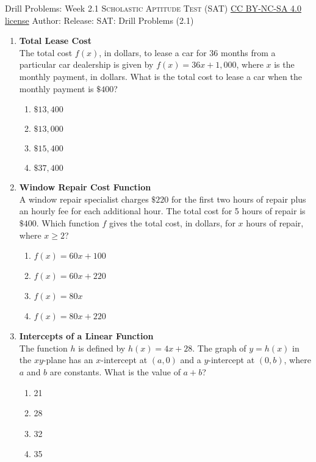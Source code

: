 \newpage\handout
{Drill Problems: Week 2.1}
{\textsc{Scholastic Aptitude Test (SAT)}}
{\href{https://creativecommons.org/licenses/by-nc-sa/4.0/}{CC BY-NC-SA 4.0 license}}
{Author: \BookAuthor}{Release: \generatedOn}
{SAT: Drill Problems (2.1)}






\begin{enumerate}

\item \textbf{Total Lease Cost}\\
The total cost $f(x)$, in dollars, to lease a car for 36 months from a particular car dealership is given by $f(x) = 36x + 1,000$, where $x$ is the monthly payment, in dollars. What is the total cost to lease a car when the monthly payment is $\$400$?
\begin{enumerate}[label=(\Alph*)]
  \item $\$13,400$
  \item $\$13,000$
  \item $\$15,400$
  \item $\$37,400$
\end{enumerate}
\begin{subanswer}
\end{subanswer}


\item \textbf{Window Repair Cost Function}\\
A window repair specialist charges $\$220$ for the first two hours of repair plus an hourly fee for each additional hour. The total cost for 5 hours of repair is $\$400$. Which function $f$ gives the total cost, in dollars, for $x$ hours of repair, where $x \geq 2$?
\begin{enumerate}[label=(\Alph*)]
  \item $f(x) = 60x + 100$
  \item $f(x) = 60x + 220$
  \item $f(x) = 80x$
  \item $f(x) = 80x + 220$
\end{enumerate}
\begin{subanswer}
\end{subanswer}

\newpage

\item \textbf{Intercepts of a Linear Function}\\
The function $h$ is defined by $h(x) = 4x + 28$. The graph of $y = h(x)$ in the $xy$-plane has an $x$-intercept at $(a, 0)$ and a $y$-intercept at $(0, b)$, where $a$ and $b$ are constants. What is the value of $a + b$?
\begin{enumerate}[label=(\Alph*)]
  \item 21
  \item 28
  \item 32
  \item 35
\end{enumerate}
\begin{subanswer}
\end{subanswer}


\end{enumerate}
